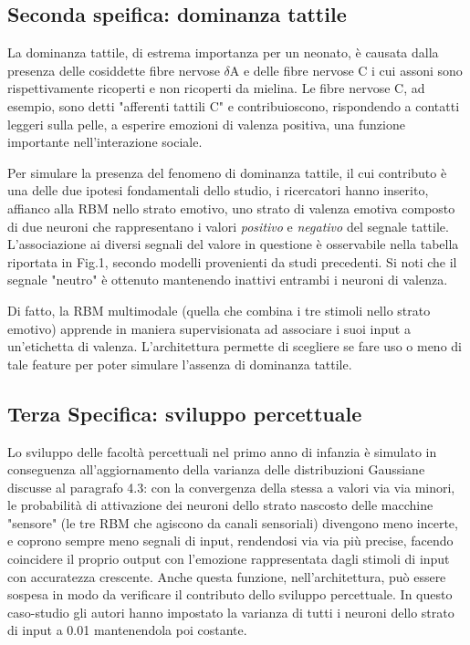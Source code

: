 \documentclass[10pt,letterpaper]{article}
\begin{document}
\subsection{Seconda speifica: dominanza tattile}
La dominanza tattile, di estrema importanza per un neonato, è causata dalla presenza delle cosiddette fibre nervose $\delta$A e delle fibre nervose C i cui assoni sono rispettivamente ricoperti e non ricoperti da mielina. Le fibre nervose C, ad esempio, sono detti "afferenti tattili C" e contribuioscono, rispondendo a contatti leggeri sulla pelle, a esperire emozioni di valenza positiva, una funzione importante nell'interazione sociale.

Per simulare la presenza del fenomeno di dominanza tattile, il cui contributo è una delle due ipotesi fondamentali dello studio, i ricercatori hanno inserito, affianco alla RBM nello strato emotivo, uno strato di valenza emotiva composto di due neuroni che rappresentano i valori \textit{positivo} e \textit{negativo} del segnale tattile. L'associazione ai diversi segnali del valore in questione è osservabile nella tabella riportata in Fig.1, secondo modelli provenienti da studi precedenti. Si noti che il segnale "neutro" è ottenuto mantenendo inattivi entrambi i neuroni di valenza.

Di fatto, la RBM multimodale (quella che combina i tre stimoli nello strato emotivo) apprende in maniera supervisionata ad associare i suoi input a un'etichetta di valenza. L'architettura permette di scegliere se fare uso o meno di tale feature per poter simulare l'assenza di dominanza tattile.

\subsection{Terza Specifica: sviluppo percettuale}
Lo sviluppo delle facoltà percettuali nel primo anno di infanzia è simulato in conseguenza all'aggiornamento della varianza delle distribuzioni Gaussiane discusse al paragrafo 4.3: con la convergenza della stessa a valori via via minori, le probabilità di attivazione dei neuroni dello strato nascosto delle macchine "sensore" (le tre RBM che agiscono da canali sensoriali) divengono meno incerte, e coprono sempre meno segnali di input, rendendosi via via più precise, facendo coincidere il proprio output con l'emozione rappresentata dagli stimoli di input con accuratezza crescente. Anche questa funzione, nell'architettura, può essere sospesa in modo da verificare il contributo dello sviluppo percettuale. In questo caso-studio gli autori hanno impostato la varianza di tutti i neuroni dello strato di input a 0.01 mantenendola poi costante.
\end{document}
